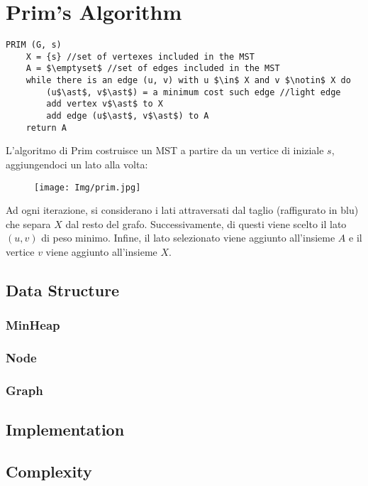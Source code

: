 \section{Prim's Algorithm}\label{prim}

\begin{lstlisting}[mathescape=true]
PRIM (G, s)
	X = {s} //set of vertexes included in the MST
	A = $\emptyset$ //set of edges included in the MST
	while there is an edge (u, v) with u $\in$ X and v $\notin$ X do
		(u$\ast$, v$\ast$) = a minimum cost such edge //light edge
		add vertex v$\ast$ to X
		add edge (u$\ast$, v$\ast$) to A
	return A	

\end{lstlisting}

L'algoritmo di Prim costruisce un MST a partire da un vertice di iniziale $s$, aggiungendoci un lato alla volta:

\begin{figure}[H]
	\centering\texttt{[image: Img/prim.jpg]}
\end{figure}

Ad ogni iterazione, si considerano i lati attraversati dal taglio (raffigurato in blu) che separa $X$ dal resto del grafo. 
Successivamente, di questi viene scelto il lato $(u, v)$ di peso minimo. 
Infine, il lato selezionato viene aggiunto all'insieme $A$ e il vertice $v$ viene aggiunto all'insieme $X$.

\subsection{Data Structure}
	
	\subsubsection{MinHeap}
				
	\subsubsection{Node}
		
	\subsubsection{Graph}
		

\subsection{Implementation}

\subsection{Complexity}

	
\pagebreak